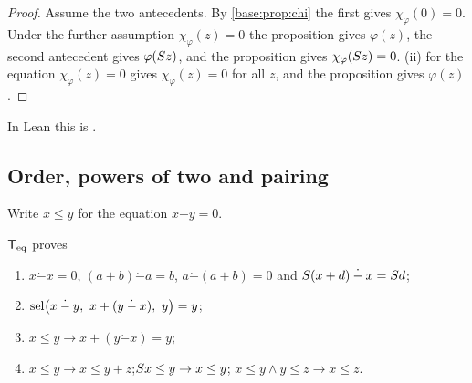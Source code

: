 \begin{proof}
Assume the two antecedents.  By \cref{base:prop:chi} the first gives
$\chi_\varphi(0)=0$.  Under the further assumption $\chi_\varphi(z)=0$ the
proposition gives $\varphi(z)$, the second antecedent gives
$\varphi(S z)$, and the proposition gives $\chi_\varphi(S z)=0$.
(ii) for the equation $\chi_\varphi(z)=0$ gives
$\chi_\varphi(z)=0$ for all $z$, and the proposition gives $\varphi(z)$.
\end{proof}

In Lean this is .

\subsection{Order, powers of two and pairing}

Write $x\le y$ for the equation $x\mathbin{\dot-}y=0$.

\begin{lemma}[Order]
\label{base:lem:order}
$\mathsf{T}_{\mathrm{eq}}$ proves
\begin{enumerate}[label=\textup{(\roman*)}]
\item $x\mathbin{\dot-}x=0$, $(a+b)\mathbin{\dot-}a=b$,
 $a\mathbin{\dot-}(a+b)=0$ and $S(x+d)\mathbin{\dot-}x=S d$;
\item $\sel\bigl(x\mathbin{\dot-}y,\ x+(y\mathbin{\dot-}x),\ y\bigr)=y$;
\item $x\le y\to x+(y\mathbin{\dot-}x)=y$;
\item $x\le y\to x\le y+z$;\quad $S x\le y\to x\le y$;\quad
 $x\le y\wedge y\le z\to x\le z$.
\end{enumerate}
\end{lemma}

